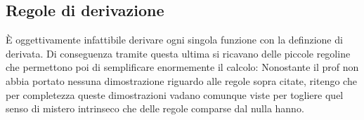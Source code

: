 \subsection{Regole di derivazione} \label{RegoleDerivazione}
È oggettivamente infattibile derivare ogni singola funzione con la definzione di derivata. Di conseguenza tramite questa ultima si ricavano delle piccole regoline che permettono poi di semplificare enormemente il calcolo:
Nonostante il prof non abbia portato nessuna dimostrazione riguardo alle regole sopra citate, ritengo che per completezza queste dimostrazioni vadano comunque viste per togliere quel senso di mistero intrinseco che delle regole comparse dal nulla hanno.\\


